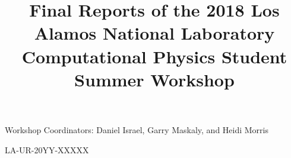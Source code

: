 \documentclass[12pt]{report}
\title{Final Reports of the 2018 Los Alamos National Laboratory
  Computational Physics Student Summer Workshop}
\author{}
\begin{document}

\begin{titlepage}
\makeatletter
\centering 


\vspace{1em}
{\LARGE\bfseries\@title}
\vspace{1em}


\vfill

Workshop Coordinators: Daniel Israel, Garry Maskaly, and Heidi Morris

LA-UR-20YY-XXXXX 
\makeatother
\end{titlepage}

\tableofcontents
\listoftodos



%  

\end{document}
